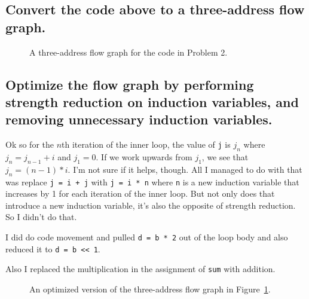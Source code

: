 \subsection{Convert the code above to a three-address flow graph.}
\begin{figure}[H]
\centering
	
\caption{A three-address flow graph for the code in Problem 2.}
\label{fig:2-b}
\end{figure}

\subsection{Optimize the flow graph by performing strength reduction on induction variables, and removing unnecessary induction variables.}

Ok so for the $n$th iteration of the inner loop, the value of \texttt{j} is $j_n$ where $j_n = j_{n-1} + i$ and $j_1 = 0$.
If we work upwards from $j_1$, we see that $j_n = (n-1)*i$.
I'm not sure if it helps, though.
All I managed to do with that was replace \texttt{j = i + j} with \texttt{j = i * n} where \texttt{n} is a new induction variable that increases by 1 for each iteration of the inner loop.
But not only does that introduce a new induction variable, it's also the opposite of strength reduction.
So I didn't do that.

I did do code movement and pulled \texttt{d = b * 2} out of the loop body and also reduced it to \texttt{d = b << 1}.

Also I replaced the multiplication in the assignment of \texttt{sum} with addition.

\begin{figure}[H]
\centering
	
\caption{An optimized version of the three-address flow graph in Figure~\ref{fig:2-b}.}
\label{fig:2-c}
\end{figure}

